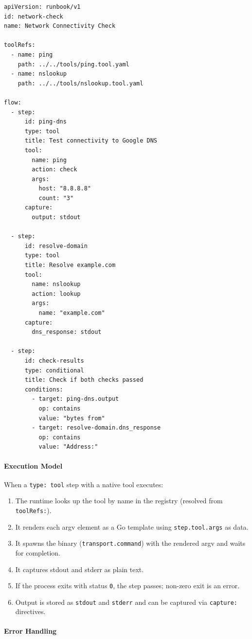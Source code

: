 \begin{verbatim}
apiVersion: runbook/v1
id: network-check
name: Network Connectivity Check

toolRefs:
  - name: ping
    path: ../../tools/ping.tool.yaml
  - name: nslookup
    path: ../../tools/nslookup.tool.yaml

flow:
  - step:
      id: ping-dns
      type: tool
      title: Test connectivity to Google DNS
      tool:
        name: ping
        action: check
        args:
          host: "8.8.8.8"
          count: "3"
      capture:
        output: stdout

  - step:
      id: resolve-domain
      type: tool
      title: Resolve example.com
      tool:
        name: nslookup
        action: lookup
        args:
          name: "example.com"
      capture:
        dns_response: stdout

  - step:
      id: check-results
      type: conditional
      title: Check if both checks passed
      conditions:
        - target: ping-dns.output
          op: contains
          value: "bytes from"
        - target: resolve-domain.dns_response
          op: contains
          value: "Address:"
\end{verbatim}

\paragraph{Execution Model}

When a \texttt{type: tool} step with a native tool executes:
\begin{enumerate}
  \item The runtime looks up the tool by name in the registry (resolved from
        \texttt{toolRefs:}).
  \item It renders each argv element as a Go template using \texttt{step.tool.args}
        as data.
  \item It spawns the binary (\texttt{transport.command}) with the rendered argv
        and waits for completion.
  \item It captures stdout and stderr as plain text.
  \item If the process exits with status \texttt{0}, the step passes; non-zero
        exit is an error.
  \item Output is stored as \texttt{stdout} and \texttt{stderr} and can be
        captured via \texttt{capture:} directives.
\end{enumerate}

\paragraph{Error Handling}

